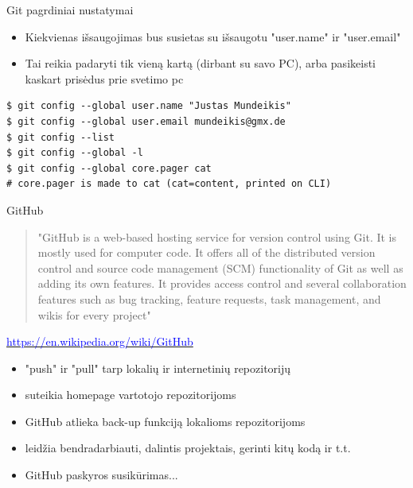 \documentclass[11pt,xcolor=table]{beamer}
\begin{document}
\begin{frame}[fragile]{Git pagrdiniai nustatymai}
\begin{itemize}
\item Kiekvienas išsaugojimas bus susietas su išsaugotu "user.name" ir "user.email"
\item Tai reikia padaryti tik vieną kartą (dirbant su savo PC), arba pasikeisti kaskart prisėdus prie svetimo pc
\end{itemize}
\begin{lstlisting}
$ git config --global user.name "Justas Mundeikis"
$ git config --global user.email mundeikis@gmx.de
$ git config --list
$ git config --global -l
$ git config --global core.pager cat 
# core.pager is made to cat (cat=content, printed on CLI)
\end{lstlisting}
\end{frame}
\begin{frame}{GitHub}
\begin{quote}
"GitHub  is a web-based hosting service for version control using Git. It is mostly used for computer code. It offers all of the distributed version control and source code management (SCM) functionality of Git as well as adding its own features. It provides access control and several collaboration features such as bug tracking, feature requests, task management, and wikis for every project"
\end{quote}
\href{https://en.wikipedia.org/wiki/GitHub}{\textcolor{blue}{https://en.wikipedia.org/wiki/GitHub}}

\begin{itemize}
\item "push" ir "pull" tarp lokalių ir internetinių repozitorijų
\item suteikia homepage vartotojo repozitorijoms
\item GitHub atlieka back-up funkciją lokalioms repozitorijoms
\item leidžia bendradarbiauti, dalintis projektais, gerinti kitų kodą ir t.t.
\item GitHub paskyros susikūrimas...
\end{itemize}
\end{frame}
\end{document}
